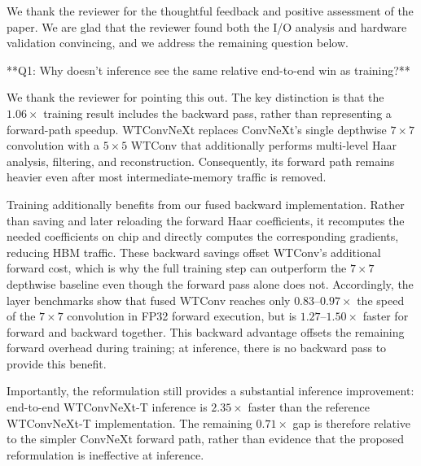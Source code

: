 \documentclass[11pt]{article}
\begin{document}
\begin{markdown}
We thank the reviewer for the thoughtful feedback and positive assessment of the paper. We are glad that the reviewer found both the I/O analysis and hardware validation convincing, and we address the remaining question below.

**Q1: Why doesn't inference see the same relative end-to-end win as training?**

We thank the reviewer for pointing this out. The key distinction is that the $1.06\times$ training result includes the backward pass, rather than representing a forward-path speedup. WTConvNeXt replaces ConvNeXt's single depthwise $7\times7$ convolution with a $5\times5$ WTConv that additionally performs multi-level Haar analysis, filtering, and reconstruction. Consequently, its forward path remains heavier even after most intermediate-memory traffic is removed.

Training additionally benefits from our fused backward implementation. Rather than saving and later reloading the forward Haar coefficients, it recomputes the needed coefficients on chip and directly computes the corresponding gradients, reducing HBM traffic. These backward savings offset WTConv's additional forward cost, which is why the full training step can outperform the $7\times7$ depthwise baseline even though the forward pass alone does not.
Accordingly, the layer benchmarks show that fused WTConv reaches only $0.83$--$0.97\times$ the speed of the $7\times7$ convolution in FP32 forward execution, but is $1.27$--$1.50\times$ faster for forward and backward together. This backward advantage offsets the remaining forward overhead during training; at inference, there is no backward pass to provide this benefit. 

Importantly, the reformulation still provides a substantial inference improvement: end-to-end WTConvNeXt-T inference is $2.35\times$ faster than the reference WTConvNeXt-T implementation. The remaining $0.71\times$ gap is therefore relative to the simpler ConvNeXt forward path, rather than evidence that the proposed reformulation is ineffective at inference.
\end{markdown}
\end{document}
